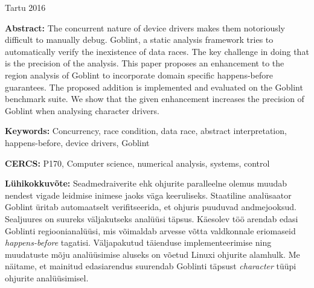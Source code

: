 \documentclass{style/master-thesis}
\begin{document}
\vfill
\centerline{Tartu 2016}



\pagebreak

\noindent\textbf{\large \articleName}
\vspace*{3ex}
\begin{flushleft}
  \textbf{Abstract:} The concurrent nature of device drivers makes them notoriously difficult to manually debug.
  Goblint, a static analysis framework tries to automatically verify the inexistence of data races. 
  The key challenge in doing that is the precision of the analysis.
  This paper proposes an enhancement to the region analysis of Goblint to incorporate domain specific happens-before guarantees. 
  The proposed addition is implemented and evaluated on the Goblint benchmark suite.
  We show that the given enhancement increases the precision of Goblint when analysing character drivers.
\end{flushleft}


\vspace*{3ex}
\begin{flushleft}
  \textbf{Keywords:} Concurrency, race condition, data race, abstract interpretation, happens-before, device drivers, Goblint
\end{flushleft}
\vspace*{3ex}

\noindent\textbf{CERCS:} P170, Computer science, numerical analysis, systems, control

\vspace*{5ex}
\noindent\textbf{\large \articleNameEE}
\vspace*{3ex}

\begin{flushleft}
  \textbf{Lühikokkuvõte:} Seadmedraiverite ehk ohjurite paralleelne olemus muudab nendest vigade leidmise inimese jaoks väga keeruliseks.
  Staatiline analüsaator Goblint üritab automaatselt verifitseerida, et ohjuris puuduvad andmejooksud. Sealjuures on suureks väljakutseks analüüsi täpsus.
  Käesolev töö arendab edasi Goblinti regioonianalüüsi, mis võimaldab  arvesse võtta valdkonnale eriomaseid \textit{happens-before} tagatisi.
  Väljapakutud täienduse implementeerimise ning muudatuste mõju analüüsimise aluseks on võetud Linuxi ohjurite alamhulk.
  Me näitame, et mainitud edasiarendus suurendab Goblinti täpsust \textit{character} tüüpi ohjurite analüüsimisel.
\end{flushleft}
\vspace*{3ex}
\end{document}
